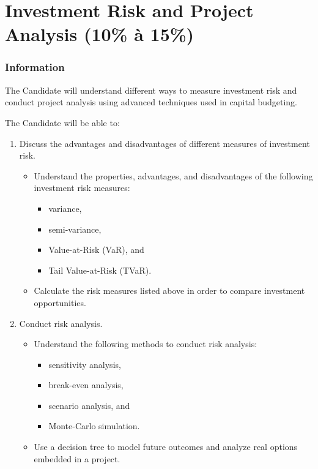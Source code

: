 \chapter[Investment Risk and Project Analysis]{Investment Risk and Project Analysis (10\% à 15\%)}

\subsection{Information}

\begin{distributions}[Objective]
The Candidate will understand different ways to measure investment risk and conduct project analysis using advanced techniques used in capital budgeting.
\end{distributions}

\begin{outcomes}
The Candidate will be able to:
\begin{enumerate}[label = \alph*)]
	\item	Discuss the advantages and disadvantages of different measures of investment risk.
		\begin{knowledge}[]
		\begin{itemize}
		\item	Understand the properties, advantages, and disadvantages of the following investment risk measures: 
			\begin{itemize}
			\item	variance, 
			\item	semi-variance, 
			\item	Value-at-Risk (VaR), and 
			\item	Tail Value-at-Risk (TVaR).
			\end{itemize}
		\item	Calculate the risk measures listed above in order to compare investment opportunities.
		\end{itemize}
		\end{knowledge}
	\item	Conduct risk analysis.
		\begin{knowledge}[]
		\begin{itemize}
		\item	Understand the following methods to conduct risk analysis: 
			\begin{itemize}
			\item	sensitivity analysis, 
			\item	break-even analysis, 
			\item	scenario analysis, and 
			\item	Monte-Carlo simulation.
			\end{itemize}
		\item	Use a decision tree to model future outcomes and analyze real options embedded in a project.
		\end{itemize}
		\end{knowledge}
	\end{enumerate}
\end{outcomes}

